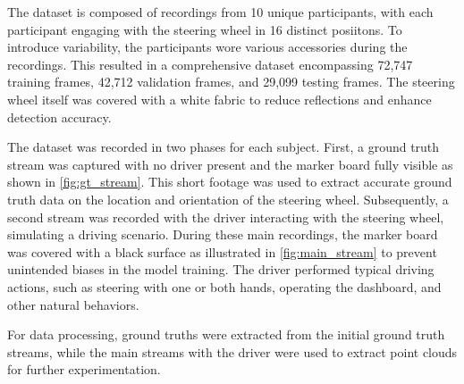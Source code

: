 The dataset is composed of recordings from 10 unique participants, 
with each participant engaging with the steering wheel in 16 distinct 
posiitons. To introduce variability, the participants wore various 
accessories during the recordings. 
This resulted in a comprehensive dataset encompassing 72,747 training 
frames, 42,712 validation frames, and 29,099 testing frames. 
The steering wheel itself was covered with a white fabric to 
reduce reflections and enhance detection accuracy.

The dataset was recorded in two phases for each subject. 
First, a ground truth stream was captured with no driver 
present and the marker board fully visible as shown in \cref{fig:gt_stream}. 
This short footage was used to extract accurate ground truth data on 
the location and orientation of the steering wheel. 
Subsequently, a second stream was recorded with the driver 
interacting with the steering wheel, simulating a driving 
scenario. During these main recordings, the marker board was 
covered with a black surface as illustrated in \cref{fig:main_stream} to prevent unintended biases in 
the model training. 
The driver performed typical driving 
actions, such as steering with one or both hands, operating 
the dashboard, and other natural behaviors. 

For data processing, ground truths were extracted from the initial 
ground truth streams, while the main streams with the driver were 
used to extract point clouds for further experimentation.

